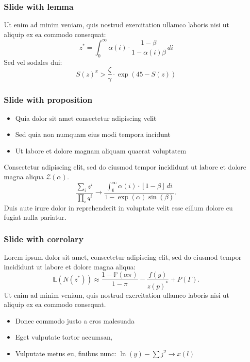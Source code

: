 \documentclass[11pt,xcolor={dvipsnames},hyperref={pdftex,pdfpagemode=UseNone,hidelinks,pdfdisplaydoctitle=true},usepdftitle=false]{beamer}
\begin{document}
\begin{frame}
\frametitle{Slide with lemma}
\begin{lemma}
 Ut enim ad minim veniam, quis nostrud exercitation ullamco laboris nisi ut aliquip ex ea commodo consequat:
\begin{equation}
z^* = \int_{0}^{\infty} \alpha(i) \cdot \frac{1-\beta}{1-\alpha(i)\beta}\,di
\end{equation}
Sed vel sodales dui: 
\begin{equation}
S(z)^x > \frac{\zeta}{\gamma} \cdot \exp(45- S(z))
\end{equation}
\end{lemma}
\end{frame}

\begin{frame}
\frametitle{Slide with proposition}
\begin{itemize}
\item Quia dolor sit amet consectetur adipiscing velit
\item Sed quia non numquam eius modi tempora incidunt
\item Ut labore et dolore magnam aliquam quaerat voluptatem
\end{itemize}
\begin{proposition}
Consectetur adipiscing elit, sed do eiusmod tempor incididunt ut labore et dolore magna aliqua $\mathcal{Z}(\alpha)$. 
\begin{equation*}
\frac{\sum_i z^i}{\prod_i q^i} \to \frac{\int_{0}^{\infty} \alpha(i) \cdot [1-\beta]\,di}{1-\exp(\alpha)\sin(\beta)}.
\end{equation*}
Duis aute irure dolor in reprehenderit in voluptate velit esse cillum dolore eu fugiat nulla pariatur. 
\end{proposition}
\end{frame}

\begin{frame}
\frametitle{Slide with corrolary}
\begin{corollary}
Lorem ipsum dolor sit amet, consectetur adipiscing elit, sed do eiusmod tempor incididunt ut labore et dolore magna aliqua:
\begin{equation*}
\mathbb{E}(N(z^*)) \approx \frac{1-\mathbb{P}(\alpha\pi)}{1-\pi}- \frac{f(y)}{z(p)^*} + P(\Gamma).
\end{equation*}
Ut enim ad minim veniam, quis nostrud exercitation ullamco laboris nisi ut aliquip ex ea commodo consequat.
\end{corollary}
\begin{itemize}
\item Donec commodo justo a eros malesuada
\item Eget vulputate tortor accumsan, 
\item Vulputate metus eu, finibus nunc: $\ln(y) - \sum j^2 \to x(l)$
\end{itemize}
\end{frame}
\end{document}
